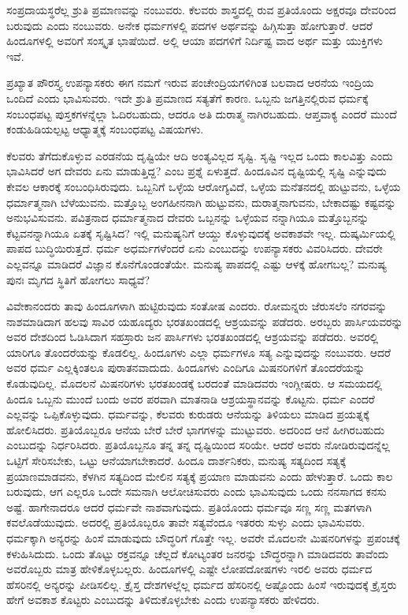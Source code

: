 ಸಂಪ್ರದಾಯಸ್ಥರೆಲ್ಲ ಶ್ರುತಿ ಪ್ರಮಾಣವನ್ನು ನಂಬುವರು. ಕೆಲವರು ಶಾಸ್ತ್ರದಲ್ಲಿ ರುವ ಪ್ರತಿಯೊಂದು ಅಕ್ಷರವೂ ದೇವರಿಂದ ಬರುವುದು ಎಂದು ನಂಬುವರು. ಅನೇಕ ಧರ್ಮಗಳಲ್ಲಿ ಪದಗಳ ಅರ್ಥವನ್ನು ಹಿಗ್ಗಿಸುತ್ತಾ ಹೋಗುತ್ತಾರೆ. ಆದರೆ ಹಿಂದೂಗಳಲ್ಲಿ ಅವರಿಗೆ ಸಂಸ್ಕೃತ ಭಾಷೆಯಿದೆ. ಅಲ್ಲಿ ಆಯಾ ಪದಗಳಿಗೆ ನಿರ್ದಿಷ್ಟ ವಾದ ಅರ್ಥ ಮತ್ತು ಯುಕ್ತಿಗಳು ಇವೆ.

ಪ್ರಖ್ಯಾತ ಪೌರಸ್ತ್ಯ ಉಪನ್ಯಾಸಕರು ಈಗ ನಮಗೆ ಇರುವ ಪಂಚೇಂದ್ರಿಯಗಳಿಗಿಂತ ಬಲವಾದ ಆರನೆಯ ಇಂದ್ರಿಯ ಒಂದಿದೆ ಎಂದು ಭಾವಿಸುವರು. ಇದೇ ಶ್ರುತಿ ಪ್ರಮಾಣದ ಸತ್ಯತೆಗೆ ಕಾರಣ. ಒಬ್ಬನು ಜಗತ್ತಿನಲ್ಲಿರುವ ಧರ್ಮಕ್ಕೆ ಸಂಬಂಧಪಟ್ಟ ಪುಸ್ತಕಗಳನ್ನೆಲ್ಲಾ ಓದಿರಬಹುದು, ಆದರೂ ಅತಿ ದುರಾತ್ಮ ನಾಗಿರಬಹುದು. ಆಪ್ತವಾಕ್ಯ ಎಂದರೆ ಮುಂದೆ ಕಂಡುಹಿಡಿಯಲ್ಪಟ್ಟ ಆಧ್ಯಾತ್ಮಕ್ಕೆ ಸಂಬಂಧಪಟ್ಟ ವಿಷಯಗಳು.

ಕೆಲವರು ತೆಗೆದುಕೊಳ್ಳುವ ಎರಡನೆಯ ದೃಷ್ಟಿಯೇ ಆದಿ ಅಂತ್ಯವಿಲ್ಲದ ಸೃಷ್ಟಿ. ಸೃಷ್ಟಿ ಇಲ್ಲದ ಒಂದು ಕಾಲವಿತ್ತು ಎಂದು ಭಾವಿಸಿದರೆ ಅಗ ದೇವರು ಏನು ಮಾಡುತ್ತಿದ್ದ? ಎಂಬ ಪ್ರಶ್ನೆ ಏಳುತ್ತದೆ. ಹಿಂದೂವಿನ ದೃಷ್ಟಿಯಲ್ಲಿ ಸೃಷ್ಟಿ ಎನ್ನುವುದು ಕೇವಲ ಆಕಾರಕ್ಕೆ ಸಂಬಂಧಿಸಿರುವುದು. ಒಬ್ಬನಿಗೆ ಒಳ್ಳೆಯ ಆರೋಗ್ಯವಿದೆ, ಒಳ್ಳೆಯ ಮನೆತನದಲ್ಲಿ ಹುಟ್ಟುವನು, ಒಳ್ಳೆಯ ಧರ್ಮಾತ್ಮನಾಗಿ ಬೆಳೆಯುವನು. ಮತ್ತೊಬ್ಬ ಅಂಗಹೀನನಾಗಿ ಹುಟ್ಟುವನು, ದುರಾತ್ಮನಾಗುವನು, ಬೇಕಾದಷ್ಟು ಕಷ್ಟವನ್ನು ಅನುಭವಿಸುವನು. ಪವಿತ್ರನಾದ ಧರ್ಮಾತ್ಮನಾದ ದೇವರು ಒಬ್ಬನನ್ನು ಒಳ್ಳೆಯವ ನನ್ನಾಗಿಯೂ ಮತ್ತೊಬ್ಬನನ್ನು ಕೆಟ್ಟವನನ್ನಾಗಿಯೂ ಏತಕ್ಕೆ ಸೃಷ್ಟಿಸಿದ? ಇಲ್ಲಿ ಮನುಷ್ಯನಿಗೆ ಆಯ್ದು ಕೊಳ್ಳುವುದಕ್ಕೆ ಅವಕಾಶವೇ ಇಲ್ಲ. ದುಷ್ಕರ್ಮಿಯಲ್ಲಿ ಪಾಪದ ಬುದ್ಧಿಯಿರುತ್ತದೆ. ಧರ್ಮ ಅಧರ್ಮಗಳೆಂದರೆ ಏನು ಎಂಬುದನ್ನು ಉಪನ್ಯಾಸಕರು ವಿವರಿಸಿದರು. ದೇವರೇ ಎಲ್ಲವನ್ನೂ ಮಾಡಿದರೆ ವಿಜ್ಞಾನ ಕೊನೆಗೊಂಡಂತೆಯೇ. ಮನುಷ್ಯ ಪಾಪದಲ್ಲಿ ಎಷ್ಟು ಆಳಕ್ಕೆ ಹೋಗಬಲ್ಲ? ಮನುಷ್ಯ ಪುನಃ ಮೃಗದ ಸ್ಥಿತಿಗೆ ಹೋಗಲು ಸಾಧ್ಯವೆ?

ವಿವೇಕಾನಂದರು ತಾವು ಹಿಂದೂಗಳಾಗಿ ಹುಟ್ಟಿರುವುದು ಸಂತೋಷ ಎಂದರು. ರೋಮನ್ನರು ಜೆರುಸಲೆಂ ನಗರವನ್ನು ನಾಶಮಾಡಿದಾಗ ಹಲವು ಸಾವಿರ ಯಹೂದ್ಯರು ಭರತಖಂಡದಲ್ಲಿ ಆಶ್ರಯವನ್ನು ಪಡೆದರು. ಅರಬ್ಬರು ಪಾರ್ಸಿಯವರನ್ನು ಅವರ ದೇಶದಿಂದ ಓಡಿಸಿದಾಗ ಸಹಸ್ರಾರು ಜನ ಪಾರ್ಸಿಗಳು ಭರತಖಂಡದಲ್ಲಿ ಆಶ್ರಯವನ್ನು ಪಡೆದರು. ಅವರಲ್ಲಿ ಯಾರಿಗೂ ತೊಂದರೆಯನ್ನು ಕೊಡಲಿಲ್ಲ. ಹಿಂದೂಗಳು ಎಲ್ಲಾ ಧರ್ಮಗಳೂ ಸತ್ಯ ಎನ್ನುವುದನ್ನು ನಂಬುವರು. ಆದರೆ ಅವರ ಧರ್ಮ ಎಲ್ಲಕ್ಕಿಂತಲೂ ಪುರಾತನವಾದುದು. ಹಿಂದೂಗಳು ಎಂದಿಗೂ ಮಿಷನರಿಗಳಿಗೆ ತೊಂದರೆಯನ್ನು ಕೊಡುವುದಿಲ್ಲ. ಮೊದಲನೆ ಮಿಷನರಿಗಳು ಭರತಖಂಡಕ್ಕೆ ಬರದಂತೆ ಮಾಡಿದವರು ಇಂಗ್ಲೀಷರು. ಆ ಸಮಯದಲ್ಲಿ ಹಿಂದೂ ಒಬ್ಬನು ಮುಂದೆ ಬಂದು ಅವರ ಪರವಾಗಿ ಮಾತನಾಡಿ ಆಶ್ರಯಸ್ಥಾನವನ್ನು ಕೊಟ್ಟನು. ಧರ್ಮ ಎಂದರೆ ಎಲ್ಲವನ್ನು ಒಪ್ಪಿಕೊಳ್ಳುವುದು. ಧರ್ಮವನ್ನು, ಕೆಲವರು ಕುರುಡರು ಆನೆಯನ್ನು ತಿಳಿಯಲು ಮಾಡಿದ ಪ್ರಯತ್ನಕ್ಕೆ ಹೋಲಿಸಿದರು. ಪ್ರತಿಯೊಬ್ಬರೂ ಆನೆಯ ಬೇರೆ ಬೇರೆ ಭಾಗಗಳನ್ನು ಮುಟ್ಟುವರು. ಅದರಿಂದ ಆನೆ ಹೀಗಿರಬಹುದು ಎಂಬುದನ್ನು ನಿರ್ಧರಿಸಿದರು. ಪ್ರತಿಯೊಬ್ಬನೂ ತನ್ನ ತನ್ನ ದೃಷ್ಟಿಯಿಂದ ಸರಿಯೇ. ಆದರೆ ಅವರು ನೋಡಿರುವುದನ್ನೆಲ್ಲ ಒಟ್ಟಿಗೆ ಸೇರಿಸಬೇಕು, ಒಟ್ಟು ಆನೆಯಾಗಬೇಕಾದರೆ. ಹಿಂದೂ ದಾರ್ಶನಿಕರು, ಮನುಷ್ಯ ಸತ್ಯದಿಂದ ಸತ್ಯಕ್ಕೆ ಪ್ರಯಾಣಮಾಡವನು, ಕೆಳಗಿನ ಸತ್ಯದಿಂದ ಮೇಲಿನ ಸತ್ಯಕ್ಕೆ ಪ್ರಯಾಣ ಮಾಡುವನು ಎಂದು ಹೇಳುತ್ತಾರೆ. ಒಂದು ಕಾಲ ಬರುವುದು, ಆಗ ಎಲ್ಲರೂ ಒಂದೇ ಸಮನಾಗಿ ಆಲೋಚಿಸುವರು ಎಂದು ಭಾವಿಸುವುದು ಒಂದು ನನಸಾಗದ ಕನಸು ಅಷ್ಟೆ. ಹಾಗೇನಾದರೂ ಆದರೆ ಧರ್ಮವೇ ನಾಶವಾಗುವುದು. ಪ್ರತಿಯೊಂದು ಧರ್ಮವೂ ಸಣ್ಣ ಸಣ್ಣ ಮತಗಳಾಗಿ ಕವಲೊಡೆಯುವುದು. ಅದರಲ್ಲಿ ಪ್ರತಿಯೊಬ್ಬರೂ ತಾವೇ ಸತ್ಯವೆಂದೂ ಇತರರು ಸುಳ್ಳು ಎಂದು ಭಾವಿಸುವರು. ಧರ್ಮಕ್ಕಾಗಿ ಅನ್ಯರನ್ನು ಹಿಂಸೆ ಮಾಡುವುದು ಬೌದ್ಧರಿಗೆ ಗೊತ್ತೇ ಇಲ್ಲ. ಅವರೇ ಮೊದಲನೇ ಮಿಷನರಿಗಳನ್ನು ಪ್ರಪಂಚಕ್ಕೆ ಕಳುಹಿಸಿದುದು. ಒಂದು ತೊಟ್ಟು ರಕ್ತವನ್ನೂ ಚೆಲ್ಲದೆ ಕೋಟ್ಯಂತರ ಜನರನ್ನು ಬೌದ್ಧರನ್ನಾಗಿ ಮಾಡಿದವರು ತಾವೆಂದು ಅವರೊಬ್ಬರು ಮಾತ್ರ ಹೇಳಿಕೊಳ್ಳಬಲ್ಲರು. ಹಿಂದೂಗಳಲ್ಲಿ ಎಷ್ಟೇ ಲೋಪದೋಷಗಳು ಇರಲಿ ಅವರು ಧರ್ಮದ ಹೆಸರಿನಲ್ಲಿ ಅನ್ಯರನ್ನು ಪೀಡಿಸಲಿಲ್ಲ. ಕ್ರೈಸ್ತ ದೇಶಗಳಲ್ಲೆಲ್ಲ ಧರ್ಮದ ಹೆಸರಿನಲ್ಲಿ ಅಷ್ಟೊಂದು ಹಿಂಸೆ ಇರುವುದಕ್ಕೆ ಕ್ರೈಸ್ತರು ಹೇಗೆ ಅವಕಾಶ ಕೊಟ್ಟರು ಎಂಬುದನ್ನು ತಿಳಿದುಕೊಳ್ಳಬೇಕು ಎಂದು ಉಪನ್ಯಾಸಕರು ಹೇಳಿದರು.

